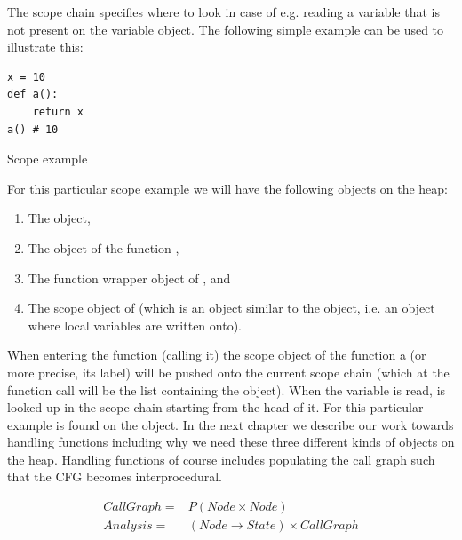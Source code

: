 The scope chain specifies where to look in case of e.g. reading a variable that is not present on the variable object. The following simple example can be used to illustrate this:

\begin{listing}[H]
	\begin{verbatim}
x = 10
def a():
	return x
a() # 10
	\end{verbatim}
\caption{Scope example}\label{code:ScopeExample}
\end{listing}

For this particular scope example we will have the following objects on the heap:

\begin{enumerate}
  \item The  object,
  \item The object of the function ,
  \item The function wrapper object of , and
  \item The scope object of  (which is an object similar to the  object, i.e. an object where local variables are written onto).
\end{enumerate}

When entering the function (calling it) the scope object of the function a (or more precise, its label) will be pushed onto the current scope chain (which at the function call will be the list containing the  object). When the variable  is read,  is looked up in the scope chain starting from the head of it. For this particular example  is found on the  object. In the next chapter we describe our work towards handling functions including why we need these three different kinds of objects on the heap. Handling functions of course includes populating the call graph such that the CFG becomes interprocedural.

\begin{eqnarray*}
CallGraph = & P(Node \times Node) \\
Analysis = & (Node \rightarrow State) \times CallGraph
\end{eqnarray*}
